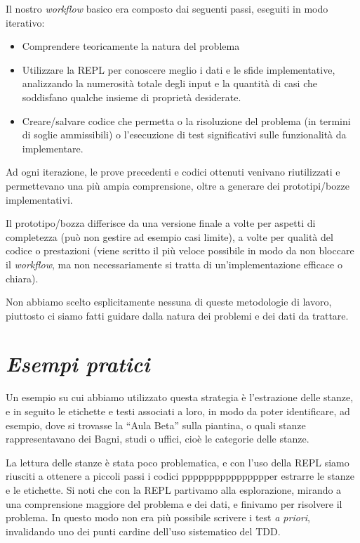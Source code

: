 \documentclass[12pt]{report}
\begin{document}
Il nostro \textit{workflow} basico era composto dai seguenti passi, eseguiti in modo iterativo:

\begin{itemize}
	\item Comprendere teoricamente la natura del problema
	\item Utilizzare la REPL per conoscere meglio i dati e le sfide implementative, analizzando la numerosità totale degli input e la quantità di casi che soddisfano  qualche insieme di proprietà desiderate.
	\item Creare/salvare codice che permetta o la risoluzione del problema (in termini di soglie ammissibili) o l'esecuzione di test significativi sulle funzionalità da implementare.
\end{itemize}

Ad ogni iterazione, le prove precedenti e codici ottenuti venivano riutilizzati e permettevano una più ampia comprensione, oltre a generare dei prototipi/bozze implementativi.

Il prototipo/bozza differisce da una versione finale a volte per aspetti di completezza (può non gestire ad esempio casi limite), a volte per qualità del codice o prestazioni (viene scritto il più veloce possibile in modo da non bloccare il \textit{workflow}, ma non necessariamente si tratta di un'implementazione efficace o chiara).

Non abbiamo scelto esplicitamente nessuna di queste metodologie di lavoro, piuttosto ci siamo fatti guidare dalla natura dei problemi e dei dati da trattare. 

\section*{\textit{Esempi pratici}}

Un esempio su cui abbiamo utilizzato questa strategia è l'estrazione delle stanze, e in seguito le etichette e testi associati a loro, in modo da poter identificare, ad esempio, dove si trovasse la ``Aula Beta'' sulla piantina, o quali stanze rappresentavano dei Bagni, studi o uffici, cioè le categorie delle stanze.

La lettura delle stanze è stata poco problematica, e con l'uso della REPL siamo riusciti a ottenere a piccoli passi i codici pppppppppppppppper estrarre le stanze e le etichette. Si noti che con la REPL partivamo alla esplorazione, mirando a una comprensione maggiore del problema e dei dati, e finivamo per risolvere il problema. In questo modo non era più possibile scrivere i test \textit{a priori}, invalidando uno dei punti cardine dell'uso sistematico del TDD.
\end{document}
